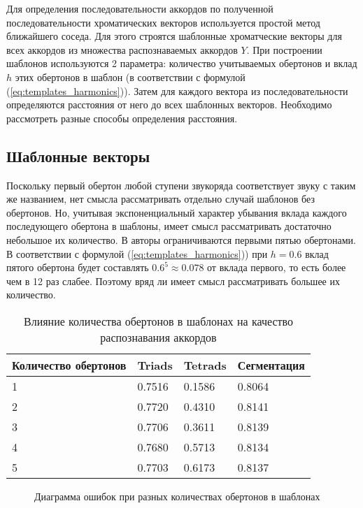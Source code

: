 Для определения последовательности аккордов по полученной последовательности
хроматических векторов используется простой метод ближайшего соседа. Для этого
строятся шаблонные хроматческие векторы для всех аккордов из множества
распознаваемых аккордов $Y$. При построении шаблонов используются 2 параметра:
количество учитываемых обертонов и вклад $h$ этих обертонов в шаблон (в
соответствии с формулой (\ref{eq:templates_harmonics})). Затем для каждого
вектора из последовательности определяются расстояния от него до всех шаблонных
векторов. Необходимо рассмотреть разные способы определения расстояния.

\subsection{Шаблонные векторы} \label{ssect3_templates}

Поскольку первый обертон любой ступени звукоряда соответствует звуку с таким же
названием, нет смысла рассматривать отдельно случай шаблонов без обертонов. Но,
учитывая экспоненциальный характер убывания вклада каждого последующего обертона
в шаблоны, имеет смысл рассматривать достаточно небольшое их количество. В
\cite{Oudre2009} авторы ограничиваются первыми пятью обертонами. В соответствии
с формулой (\ref{eq:templates_harmonics})) при $h=0.6$ вклад пятого обертона
будет составлять $0.6^5 \approx 0.078$ от вклада первого, то есть более чем в 12
раз слабее. Поэтому вряд ли имеет смысл рассматривать большее их количество.

\begin{table} [htbp]
  \centering
  \parbox{15cm}{\caption{Влияние количества обертонов в шаблонах на качество
  распознавания аккордов} \label{Tover}}
  \begin{tabular}{|l|l|l|l|}
  \hline
  Количество обертонов & Triads & Tetrads & Сегментация \\
  \hline
  1 & 0.7516 & 0.1586 & 0.8064 \\
  2 & 0.7720 & 0.4310 & 0.8141 \\
  3 & 0.7706 & 0.3611 & 0.8139 \\
  4 & 0.7680 & 0.5713 & 0.8134 \\
  5 & 0.7703 & 0.6173 & 0.8137 \\
  \hline
  \end{tabular}
\end{table}

\begin{figure}[h]
  \begin{minipage}[h]{0.49\linewidth}
  \end{minipage}
  \hfill
  \begin{minipage}[h]{0.49\linewidth}
  \end{minipage}
  \caption{Диаграмма ошибок при разных количествах обертонов в шаблонах}
  \label{img:nHarm}
\end{figure}

